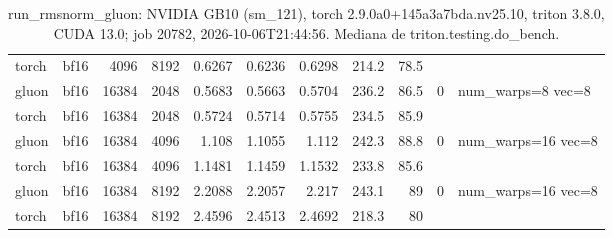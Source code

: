 \begin{table}[htbp]
\begin{tabular}{llrrrrrrrll}
    torch & bf16 & 4096 & 8192 & 0.6267 & 0.6236 & 0.6298 & 214.2 & 78.5 &  &  \\
    gluon & bf16 & 16384 & 2048 & 0.5683 & 0.5663 & 0.5704 & 236.2 & 86.5 & 0 & num\_warps=8 vec=8 \\
    torch & bf16 & 16384 & 2048 & 0.5724 & 0.5714 & 0.5755 & 234.5 & 85.9 &  &  \\
    gluon & bf16 & 16384 & 4096 & 1.108 & 1.1055 & 1.112 & 242.3 & 88.8 & 0 & num\_warps=16 vec=8 \\
    torch & bf16 & 16384 & 4096 & 1.1481 & 1.1459 & 1.1532 & 233.8 & 85.6 &  &  \\
    gluon & bf16 & 16384 & 8192 & 2.2088 & 2.2057 & 2.217 & 243.1 & 89 & 0 & num\_warps=16 vec=8 \\
    torch & bf16 & 16384 & 8192 & 2.4596 & 2.4513 & 2.4692 & 218.3 & 80 &  &  \\
    \bottomrule
  \end{tabular}
  \caption{run\_rmsnorm\_gluon: NVIDIA GB10 (sm\_121), torch 2.9.0a0+145a3a7bda.nv25.10, triton 3.8.0, CUDA 13.0; job 20782, 2026-10-06T21:44:56. Mediana de triton.testing.do\_bench.}
  \label{tab:hennessy-run-rmsnorm-gluon}
\end{table}
